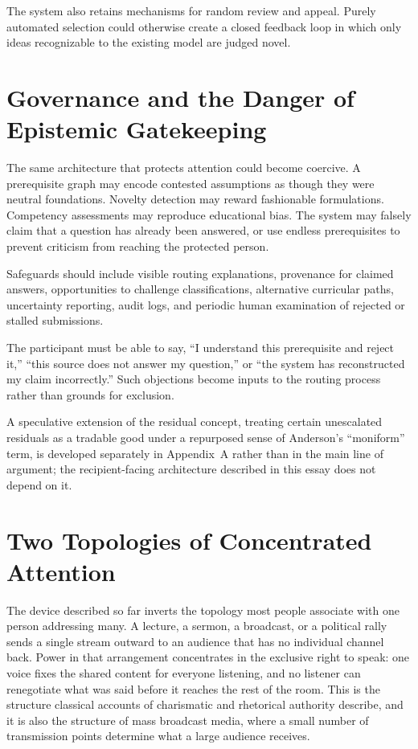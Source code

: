 \documentclass[11pt]{article}
\begin{document}
The system also retains mechanisms for random review and appeal. Purely automated selection could otherwise create a closed feedback loop in which only ideas recognizable to the existing model are judged novel.

\section{Governance and the Danger of Epistemic Gatekeeping}

The same architecture that protects attention could become coercive. A prerequisite graph may encode contested assumptions as though they were neutral foundations. Novelty detection may reward fashionable formulations. Competency assessments may reproduce educational bias. The system may falsely claim that a question has already been answered, or use endless prerequisites to prevent criticism from reaching the protected person.

Safeguards should include visible routing explanations, provenance for claimed answers, opportunities to challenge classifications, alternative curricular paths, uncertainty reporting, audit logs, and periodic human examination of rejected or stalled submissions.

The participant must be able to say, ``I understand this prerequisite and reject it,'' ``this source does not answer my question,'' or ``the system has reconstructed my claim incorrectly.'' Such objections become inputs to the routing process rather than grounds for exclusion.

A speculative extension of the residual concept, treating certain unescalated residuals as a tradable good under a repurposed sense of Anderson's ``moniform'' term, is developed separately in Appendix~A rather than in the main line of argument; the recipient-facing architecture described in this essay does not depend on it.

\section{Two Topologies of Concentrated Attention}

The device described so far inverts the topology most people associate with one person addressing many. A lecture, a sermon, a broadcast, or a political rally sends a single stream outward to an audience that has no individual channel back. Power in that arrangement concentrates in the exclusive right to speak: one voice fixes the shared content for everyone listening, and no listener can renegotiate what was said before it reaches the rest of the room. This is the structure classical accounts of charismatic and rhetorical authority describe, and it is also the structure of mass broadcast media, where a small number of transmission points determine what a large audience receives.
\end{document}
